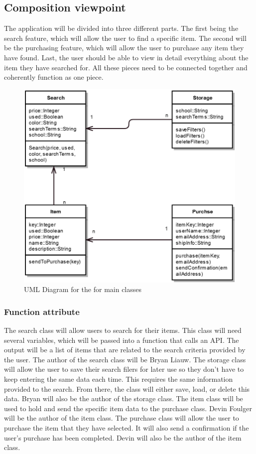 \documentclass[journal,compsoc, 10pt, draftclsnofoot, onecolumn]{IEEEtran}
\begin{document}
\subsection{Composition viewpoint}
The application will be divided into three different parts. The first being the 
search feature, which will allow the user to find a specific item. The second 
will be the purchasing feature, which will allow the user to purchase any item 
they have found. Last, the user should be able to view in detail everything 
about the item they have searched for. All these pieces need to be connected 
together and coherently function as one piece. 

\begin{figure}[h]
\centering
\caption{UML Diagram for the for main classes}
\includegraphics[scale=.65]{projectUML}
\end{figure}
\FloatBarrier

\subsubsection*{Function attribute}
The search class will allow users to search for their items. This class will need 
several variables, which will be passed into a function that calls an API. The 
output will be a list of items that are related to the search criteria provided 
by the user. The author of the search class will be Bryan Liauw. 
The storage class will allow the user to save their search filers 
for later use so they don't have to keep entering the same data each time. This 
requires the same information provided to the search. From there, the class will 
either save, load, or delete this data. Bryan will also be the author of the storage 
class. The item class will be used to hold and 
send the specific item data to the purchase class. Devin Foulger will be the 
author of the item class. The purchase class will allow 
the user to purchase the item that they have selected. It will also send a 
confirmation if the user's purchase has been completed. Devin will also be the 
author of the item class.
\end{document}
